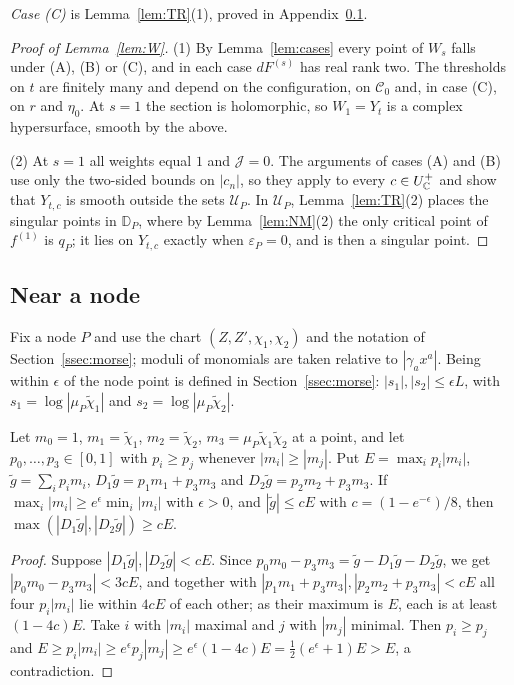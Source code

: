 \emph{Case (C)} is Lemma~\ref{lem:TR}(1), proved in Appendix~\ref{app:NM}.

\begin{proof}[Proof of Lemma~\ref{lem:W}]
(1) By Lemma~\ref{lem:cases} every point of $W_s$ falls under (A), (B) or (C), and in each case $dF^{(s)}$ has real rank
two. The thresholds on $t$ are finitely many and depend on the configuration, on $\mathscr C_0$ and, in case (C), on $r$
and $\eta_0$. At $s=1$ the section is holomorphic, so $W_1=Y_t$ is a complex hypersurface, smooth by the above.

(2) At $s=1$ all weights equal $1$ and $\mathcal J=0$. The arguments of cases (A) and (B) use only the two-sided bounds on
$|c_n|$, so they apply to every $c\in U^+_\mathbb C$ and show that $Y_{t,c}$ is smooth outside the sets $\mathcal U_P$. In $\mathcal U_P$,
Lemma~\ref{lem:TR}(2) places the singular points in $\mathbb D_P$, where by Lemma~\ref{lem:NM}(2) the only critical point of
$f^{(1)}$ is $q_P$; it lies on $Y_{t,c}$ exactly when $\varepsilon_P=0$, and is then a singular point.
\end{proof}

\subsection{Near a node}\label{app:NM}

Fix a node $P$ and use the chart $(Z,Z',\chi_1,\chi_2)$ and the notation of Section~\ref{ssec:morse}; moduli of monomials
are taken relative to $|\gamma_ax^a|$. Being within $\epsilon$ of the node point is defined in
Section~\ref{ssec:morse}: $|s_1|,|s_2|\le\epsilon L$, with $s_1=\log|\mu_P\tilde\chi_1|$ and $s_2=\log|\mu_P\tilde\chi_2|$.

\begin{lemma}\label{lem:square}
Let $m_0=1$, $m_1=\tilde\chi_1$, $m_2=\tilde\chi_2$, $m_3=\mu_P\tilde\chi_1\tilde\chi_2$ at a point, and let
$p_0,\dots,p_3\in[0,1]$ with $p_i\ge p_j$ whenever $|m_i|\ge|m_j|$. Put $E=\max_ip_i|m_i|$, $\tilde g=\sum_ip_im_i$,
$D_1\tilde g=p_1m_1+p_3m_3$ and $D_2\tilde g=p_2m_2+p_3m_3$. If $\max_i|m_i|\ge e^\epsilon\min_i|m_i|$ with $\epsilon>0$,
and $|\tilde g|\le cE$ with $c=(1-e^{-\epsilon})/8$, then $\max(|D_1\tilde g|,|D_2\tilde g|)\ge cE$.
\end{lemma}

\begin{proof}
Suppose $|D_1\tilde g|,|D_2\tilde g|<cE$. Since $p_0m_0-p_3m_3=\tilde g-D_1\tilde g-D_2\tilde g$, we get
$|p_0m_0-p_3m_3|<3cE$, and together with $|p_1m_1+p_3m_3|,|p_2m_2+p_3m_3|<cE$ all four $p_i|m_i|$ lie within $4cE$ of each
other; as their maximum is $E$, each is at least $(1-4c)E$. Take $i$ with $|m_i|$ maximal and $j$ with $|m_j|$ minimal.
Then $p_i\ge p_j$ and $E\ge p_i|m_i|\ge e^\epsilon p_j|m_j|\ge e^\epsilon(1-4c)E=\tfrac12(e^\epsilon+1)E>E$, a
contradiction.
\end{proof}

